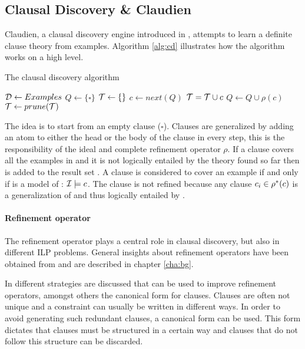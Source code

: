 \subsection{Clausal Discovery \& Claudien}
\label{sec:claudien}
Claudien, a clausal discovery engine introduced in \cite{DeRaedt:ClausalDiscovery}, attempts to learn a definite clause theory from examples.
Algorithm \ref{alg:cd} illustrates how the algorithm works on a high level. 

\begin{algorithm}
	\caption{The clausal discovery algorithm}
	\label{alg:cd}

	\begin{algorithmic}
	\State $\mathcal{D} \gets Examples$
	\State $Q \gets \{\square\}$
	\State $\mathcal{T} \gets \{\}$
		\State $c \gets next(Q)$
				\State $\mathcal{T} = \mathcal{T} \cup c$
			\EndIf
		\Else
			\State $Q \gets Q \cup \rho(c)$
		\EndIf
	\EndWhile
	\State $\mathcal{T} \gets prune(\mathcal{T})$
	\State \Return {}
	\end{algorithmic}
\end{algorithm}

The idea is to start from an empty clause ($\square$).
Clauses are generalized by adding an atom to either the head or the body of the clause in every step, this is the responsibility of the ideal and complete refinement operator $\rho$.
If a clause  covers all the examples in  and it is not logically entailed by the theory found so far then  is added to the result set .
A clause  is considered to cover an example  if and only if  is a model of : $\mathcal{I} \models c$.
The clause  is not refined because any clause $c_i \in \rho^*(c)$ is a generalization of  and thus logically entailed by .

\paragraph{Refinement operator}
The refinement operator plays a central role in clausal discovery, but also in different ILP problems.
General insights about refinement operators have been obtained from \cite{DeRaedt:LRLearning} and are described in chapter \ref{cha:bg}.

In \cite{DeRaedt:CondensedRepresentations} different strategies are discussed that can be used to improve refinement operators, amongst others the canonical form for clauses.
Clauses are often not unique and a constraint can usually be written in different ways.
In order to avoid generating such redundant clauses, a canonical form can be used.
This form dictates that clauses must be structured in a certain way and clauses that do not follow this structure can be discarded.

